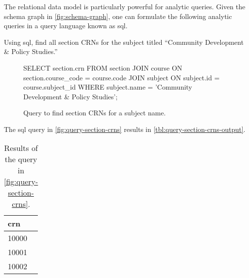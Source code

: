 		The relational data model is particularly powerful for analytic queries.  Given the schema graph in \vref{fig:schema-graph}, one can formulate the following analytic queries in a query language known as \gls{sql}.
			
		\begin{ex}
			Using \gls{sql}, find all section CRNs for the subject titled ``Community Development \& Policy Studies.''
			
			\begin{figure}[!ht]
				\begin{singlespaced}
					\begin{sqlcode}
SELECT section.crn
FROM   section 
       JOIN course 
         ON section.course_code = course.code 
       JOIN subject 
         ON subject.id = course.subject_id 
WHERE  subject.name = 'Community Development & Policy Studies'; 
					\end{sqlcode}
				\end{singlespaced}
				
				\caption{Query to find section CRNs for a subject name.}
				\label{fig:query-section-crns}
			\end{figure}
			
			The \gls{sql} query in \vref{fig:query-section-crns} results in \vref{tbl:query-section-crns-output}.
			
			\begin{table}[!ht]
				\centering
				
				\begin{tabular}{l}
					\toprule
					crn \\
					\midrule
					10000 \\
					10001 \\
					10002 \\
					\bottomrule
				\end{tabular}
				
				\caption{Results of the query in \vref{fig:query-section-crns}.}
				\label{tbl:query-section-crns-output}
			\end{table}
		\end{ex}
		
